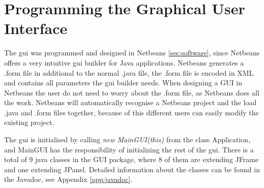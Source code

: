 \section{Programming the Graphical User Interface}
\label{secr:proggui}
The \acrshort{gui} was programmed and designed in Netbeans \ref{sec:software}, since Netbeans offers a very intuitive \acrshort{gui} builder for Java applications. Netbeans generates a .form file in additional to the normal .java file, the .form file is encoded in XML and contains all parameters the \acrshort{gui} builder needs. When designing a GUI in Netbeans the user do not need to worry about the .form file, as Netbeans does all the work. Netbeans will automatically recognise a Netbeans project and the load .java and .form files together, because of this different users can easily modify the existing project.

The \acrshort{gui} is initialised by calling \textit{new MainGUI(this)} from the class Application, and MainGUI has the responsibility of initializing the rest of the \acrshort{gui}. There is a total of 9 java classes in the GUI package, where 8 of them are extending JFrame and one extending JPanel. Detailed information about the classes can be found in the Javadoc, see Appendix \ref{app:javadoc}.